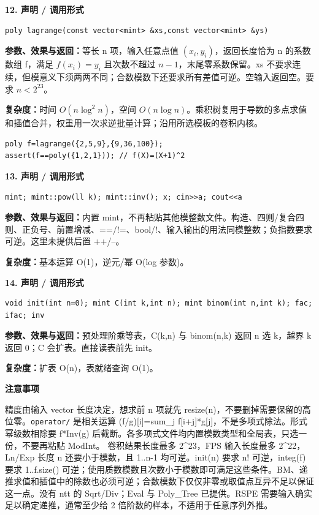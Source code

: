 \documentclass[UTF8,a4paper,10pt]{ctexart}
\newcommand{\TemplNote}[1]{\textbf{注意事项}\par #1\par}
\begin{document}
\noindent\begin{minipage}{\textwidth}
\textbf{12. 声明 / 调用形式}
\begin{lstlisting}
poly lagrange(const vector<mint> &xs,const vector<mint> &ys)
\end{lstlisting}
\textbf{参数、效果与返回：}等长 n 项，输入任意点值 $(x_i,y_i)$，返回长度恰为 n 的系数数组 f，满足 $f(x_i)=y_i$ 且次数不超过 $n-1$，末尾零系数保留。xs 不要求连续，但模意义下须两两不同；合数模数下还要求所有差值可逆。空输入返回空。要求 $n<2^{23}$。

\textbf{复杂度：}时间 $O(n\log^2 n)$，空间 $O(n\log n)$。乘积树复用于导数的多点求值和插值合并，权重用一次求逆批量计算；沿用所选模板的卷积内核。

\begin{lstlisting}
poly f=lagrange({2,5,9},{9,36,100});
assert(f==poly({1,2,1})); // f(X)=(X+1)^2
\end{lstlisting}

\end{minipage}\par\vspace{0.4em}
\noindent\begin{minipage}{\textwidth}
\textbf{13. 声明 / 调用形式}
\begin{lstlisting}
mint; mint::pow(ll k); mint::inv(); x; cin>>a; cout<<a
\end{lstlisting}
\textbf{参数、效果与返回：}内置 mint，不再粘贴其他模整数文件。构造、四则/复合四则、正负号、前置增减、==/!=、bool/!、输入输出的用法同模整数；负指数要求可逆。这里未提供后置 ++/--。

\textbf{复杂度：}基本运算 O(1)，逆元/幂 O(log 参数)。

\end{minipage}\par\vspace{0.4em}
\noindent\begin{minipage}{\textwidth}
\textbf{14. 声明 / 调用形式}
\begin{lstlisting}
void init(int n=0); mint C(int k,int n); mint binom(int n,int k); fac; ifac; inv
\end{lstlisting}
\textbf{参数、效果与返回：}预处理阶乘等表，C(k,n) 与 binom(n,k) 返回 n 选 k，越界 k 返回 0；C 会扩表。直接读表前先 init。

\textbf{复杂度：}扩表 O(n)，表就绪查询 O(1)。

\TemplNote{精度由输入 vector 长度决定，想求前 n 项就先 resize(n)，不要删掉需要保留的高位零。\texttt{operator/} 是相关运算 (f/g)[i]=sum\_j f[i+j]*g[j]，不是多项式除法。形式幂级数相除要 f*Inv(g) 后截断。各多项式文件均内置模数类型和全局表，只选一份，不要再粘贴 ModInt。 卷积结果长度最多 2\textasciicircum{}23，FPS 输入长度最多 2\textasciicircum{}22，Ln/Exp 长度 n 还要小于模数，且 1..n-1 均可逆。init(n) 要求 n! 可逆，integ(f) 要求 1..f.size() 可逆；使用质数模数且次数小于模数即可满足这些条件。BM、递推求值和插值中的除数也必须可逆；合数模数下仅仅非零或取值点互异不足以保证这一点。没有 ntt 的 Sqrt/Div；Eval 与 Poly\_Tree 已提供。RSPE 需要输入确实足以确定递推，通常至少给 2 倍阶数的样本，不适用于任意序列外推。}
\end{minipage}\par\vspace{0.4em}
\end{document}
